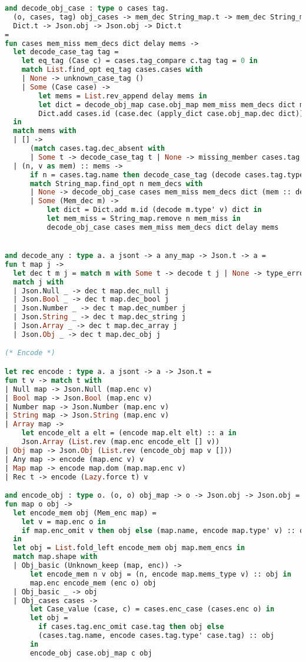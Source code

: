 \documentclass[nolinenum]{jfp}
\begin{document}
\begin{lstlisting}[language=ocaml]
and decode_obj_case : type o cases tag.
  (o, cases, tag) obj_cases -> mem_dec String_map.t -> mem_dec String_map.t ->
  Dict.t -> Json.obj -> Json.obj -> Dict.t
=
fun cases mem_miss mem_decs dict delay mems ->
  let decode_case_tag tag =
    let eq_tag (Case c) = cases.tag_compare c.tag tag = 0 in
    match List.find_opt eq_tag cases.cases with
    | None -> unknown_case_tag ()
    | Some (Case case) ->
        let mems = List.rev_append delay mems in
        let dict = decode_obj_map case.obj_map mem_miss mem_decs dict mems in
        Dict.add cases.id (case.dec (apply_dict case.obj_map.dec dict)) dict
  in
  match mems with
  | [] ->
      (match cases.tag.dec_absent with
      | Some t -> decode_case_tag t | None -> missing_member cases.tag.name)
  | (n, v as mem) :: mems ->
      if n = cases.tag.name then decode_case_tag (decode cases.tag.type' v) else
      match String_map.find_opt n mem_decs with
      | None -> decode_obj_case cases mem_miss mem_decs dict (mem :: delay) mems
      | Some (Mem_dec m) ->
          let dict = Dict.add m.id (decode m.type' v) dict in
          let mem_miss = String_map.remove n mem_miss in
          decode_obj_case cases mem_miss mem_decs dict delay mems


and decode_any : type a. a jsont -> a any_map -> Json.t -> a =
fun t map j ->
  let dec t m j = match m with Some t -> decode t j | None -> type_error () in
  match j with
  | Json.Null _ -> dec t map.dec_null j
  | Json.Bool _ -> dec t map.dec_bool j
  | Json.Number _ -> dec t map.dec_number j
  | Json.String _ -> dec t map.dec_string j
  | Json.Array _ -> dec t map.dec_array j
  | Json.Obj _ -> dec t map.dec_obj j

(* Encode *)

let rec encode : type a. a jsont -> a -> Json.t =
fun t v -> match t with
| Null map -> Json.Null (map.enc v)
| Bool map -> Json.Bool (map.enc v)
| Number map -> Json.Number (map.enc v)
| String map -> Json.String (map.enc v)
| Array map ->
    let encode_elt a elt = (encode map.elt elt) :: a in
    Json.Array (List.rev (map.enc encode_elt [] v))
| Obj map -> Json.Obj (List.rev (encode_obj map v []))
| Any map -> encode (map.enc v) v
| Map map -> encode map.dom (map.map.enc v)
| Rec t -> encode (Lazy.force t) v

and encode_obj : type o. (o, o) obj_map -> o -> Json.obj -> Json.obj =
fun map o obj ->
  let encode_mem obj (Mem_enc map) =
    let v = map.enc o in
    if map.enc_omit v then obj else (map.name, encode map.type' v) :: obj
  in
  let obj = List.fold_left encode_mem obj map.mem_encs in
  match map.shape with
  | Obj_basic (Unknown_keep (map, enc)) ->
      let encode_mem n v obj = (n, encode map.mems_type v) :: obj in
      map.enc encode_mem (enc o) obj
  | Obj_basic _ -> obj
  | Obj_cases cases ->
      let Case_value (case, c) = cases.enc_case (cases.enc o) in
      let obj =
        if cases.tag.enc_omit case.tag then obj else
        (cases.tag.name, encode cases.tag.type' case.tag) :: obj
      in
      encode_obj case.obj_map c obj
\end{lstlisting}

\label{lastpage01}
\end{document}
